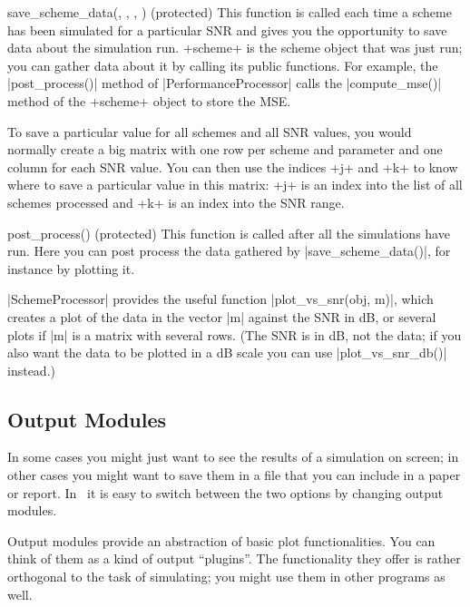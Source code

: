 \begin{method}{save_scheme_data(\obj, , , )
  (protected)}
  This function is called each time a scheme has been simulated for a particular
  SNR and gives you the opportunity to save data about the simulation run.
  +scheme+ is the scheme object that was just run; you can gather data about it
  by calling its public functions. For example, the |post_process()| method of
  |PerformanceProcessor| calls the |compute_mse()| method of the +scheme+ object
  to store the MSE.

  To save a particular value for all schemes and all SNR values, you would
  normally create a big matrix with one row per scheme and parameter and one
  column for each SNR value. You can then use the indices +j+ and +k+ to know
  where to save a particular value in this matrix: +j+ is an index into the
  list of all schemes processed and +k+ is an index into the SNR range.
\end{method}

\begin{method}{post_process(\obj) (protected)}
  This function is called after all the simulations have run. Here you can post
  process the data gathered by |save_scheme_data()|, for instance by plotting
  it.

  |SchemeProcessor| provides the useful function |plot_vs_snr(obj, m)|, which
  creates a plot of the data in the vector |m| against the SNR in dB, or
  several plots if |m| is a matrix with several rows. (The SNR is in dB, not
  the data; if you also want the data to be plotted in a dB scale you can use
  |plot_vs_snr_db()| instead.)
\end{method}


\subsection{Output Modules}

In some cases you might just want to see the results of a simulation on screen;
in other cases you might want to save them in a file that you can include in a
paper or report. In \jscsim\ it is easy to switch between the two options by
changing output modules.

Output modules provide an abstraction of basic plot functionalities. You can
think of them as a kind of output ``plugins''. The functionality they offer is
rather orthogonal to the task of simulating; you might use them in other
programs as well. 

